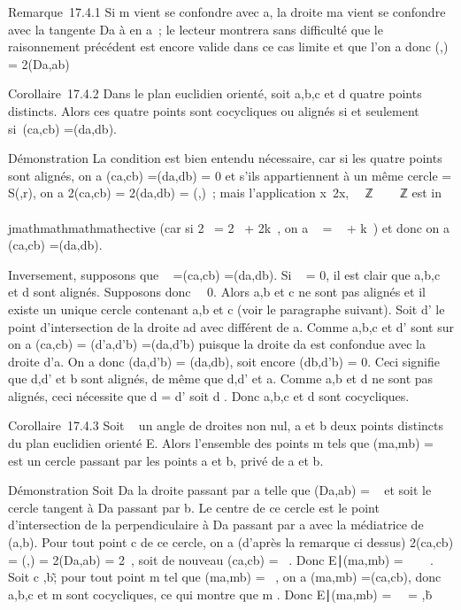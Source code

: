 Remarque~17.4.1 Si m vient se confondre avec a, la droite ma vient se
confondre avec la tangente Da à \Gamma en a~; le lecteur montrera
sans difficulté que le raisonnement précédent est encore valide dans ce
cas limite et que l'on a donc
\widehat(\overrightarrow\omegaa,\overrightarrow\omegab)
= 2\widehat(Da,ab)

Corollaire~17.4.2 Dans le plan euclidien orienté, soit a,b,c et d quatre
points distincts. Alors ces quatre points sont cocycliques ou alignés si
et seulement si~\widehat(ca,cb)
=\widehat (da,db).

Démonstration La condition est bien entendu nécessaire, car si les
quatre points sont alignés, on a \widehat(ca,cb)
=\widehat (da,db) = 0 et s'ils appartiennent à un
même cercle \Gamma = S(\omega,r), on a 2\widehat(ca,cb) =
2\widehat(da,db) =\widehat
(\overrightarrow\omegaa,\overrightarrow\omegab)~;
mais l'application x\mapsto~2x, ~\diagup\pi~ℤ \rightarrow~ ~\pi~ℤ est
in\\\\jmathmathmathmathective (car si 2\alpha~ = 2\beta~ + 2k\pi~, on a \alpha~ = \beta~ + k\pi~) et donc on a
\widehat(ca,cb) =\widehat (da,db).

Inversement, supposons que \alpha~ =\widehat (ca,cb)
=\widehat (da,db). Si \alpha~ = 0, il est clair que a,b,c
et d sont alignés. Supposons donc \alpha~\neq~0. Alors
a,b et c ne sont pas alignés et il existe un unique cercle \Gamma contenant
a,b et c (voir le paragraphe suivant). Soit d' le point d'intersection
de la droite ad avec \Gamma différent de a. Comme a,b,c et d' sont sur \Gamma on a
\widehat(ca,cb) =\widehat
(d'a,d'b) =\widehat (da,d'b) puisque la droite da
est confondue avec la droite d'a. On a donc
\widehat(da,d'b) =\widehat
(da,db), soit encore \widehat(db,d'b) = 0. Ceci
signifie que d,d' et b sont alignés, de même que d,d' et a. Comme a,b et
d ne sont pas alignés, ceci nécessite que d = d' soit d \in \Gamma. Donc a,b,c
et d sont cocycliques.

Corollaire~17.4.3 Soit \alpha~ un angle de droites non nul, a et b deux points
distincts du plan euclidien orienté E. Alors l'ensemble des points m
tels que \widehat(ma,mb) = \alpha~ est un cercle passant
par les points a et b, privé de a et b.

Démonstration Soit Da la droite passant par a telle que
\widehat(Da,ab) = \alpha~ et soit \Gamma le cercle
tangent à Da passant par b. Le centre \omega de ce cercle est le
point d'intersection de la perpendiculaire à Da passant par a
avec la médiatrice de (a,b). Pour tout point c de ce cercle, on a
(d'après la remarque ci dessus) 2\widehat(ca,cb)
=\widehat
(\overrightarrow\omegaa,\overrightarrow\omegab)
= 2\widehat(Da,ab) = 2\alpha~, soit de nouveau
\widehat(ca,cb) = \alpha~. Donc \m \in
E∣\widehat(ma,mb) =
\alpha~\ \subset~ \Gamma. Soit c \in \Gamma
\diagdown\a,b\~; pour tout point m tel que
\widehat(ma,mb) = \alpha~, on a
\widehat(ma,mb) =\widehat (ca,cb),
donc a,b,c et m sont cocycliques, ce qui montre que m \in \Gamma. Donc
\m \in
E∣\widehat(ma,mb) =
\alpha~\ = \Gamma \diagdown\a,b\.

